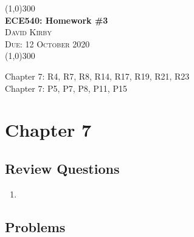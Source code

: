 \documentclass[12pt]{article}
\begin{document}
 	\begin{center}
    \line(1,0){300}\\[0.25cm]
 	\Large{\bfseries ECE540: Homework \#3}\\
 	\textsc{\large David Kirby}\\
 	\textsc{\large Due: 12 October 2020}\\
 	\line(1,0){300}\\[0.75cm]
 	\end{center}

\noindent
Chapter 7: R4, R7, R8, R14, R17, R19, R21, R23\\
Chapter 7: P5, P7, P8, P11, P15
\section*{Chapter 7}
\subsection*{Review Questions}
\begin{enumerate}
\item
\end{enumerate}
\subsection*{Problems}
\end{document}
